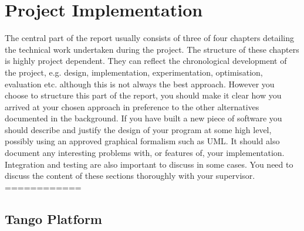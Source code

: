 \documentclass[12pt,twoside]{article}
\begin{document}
\newpage

\section{Project Implementation}
The central part of the report usually consists of three of four chapters detailing the technical work undertaken during the project. The structure of these chapters is highly project dependent. They can reflect the chronological development of the project, e.g. design, implementation, experimentation, optimisation, evaluation etc. although this is not always the best approach. However you choose to structure this part of the report, you should make it clear how you arrived at your chosen approach in preference to the other alternatives documented in the background. If you have built a new piece of software you should describe and justify the design of your program at some high level, possibly using an approved graphical formalism such as UML. It should also document any interesting problems with, or features of, your implementation. Integration and testing are also important to discuss in some cases. You need to discuss the content of these sections thoroughly with your supervisor.\\
============\\

\subsection{Tango Platform}
\end{document}
